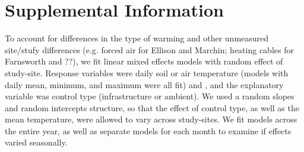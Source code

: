 \documentclass{article}
\begin{document}

\section{Supplemental Information}

To account for differences in the type of warming and other unmeasured site/stufy differences (e.g. forced air for Ellison and Marchin; heating cables for Farnsworth and ??), we fit linear mixed effects models with random effect of study-site. Response variables were daily soil or air temperature (models with daily  mean, minimum, and maximum were all fit) and , and the explanatory variable was control type (infrastructure or ambient). We used a random slopes and random intercepts structure, so that the effect of control type, as well as the mean temperature, were allowed to vary across study-sites. We fit models across the entire year, as well as separate models for each month to examine if effects varied seasonally.
\end{document}
